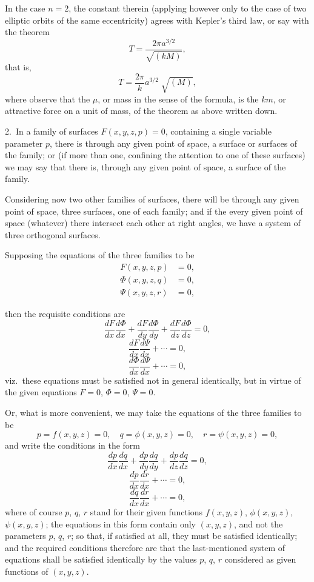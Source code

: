 \documentclass[11pt,a4paper]{book}
\begin{document}
In the case $n = 2$, the constant therein (applying however only to the case of two
elliptic orbits of the same eccentricity) agrees with Kepler's third law, or say with
the theorem
\[
T = \frac{2\pi a^{3/2}}{\sqrt{(kM)}},
\]
that is,
\[
T = \frac{2\pi}{k}a^{3/2}\;\sqrt{(M)},
\]
where observe that the $\mu$, or mass in the sense of the formula, is the $km$, or
attractive force on a unit of mass, of the theorem as above written down.

2.\ In a family of surfaces $F(x, y, z, p) = 0$, containing a single variable parameter $p$,
there is through any given point of space, a surface or surfaces of the family; or (if
more than one, confining the attention to one of these surfaces) we may say that
there is, through any given point of space, a surface of the family.

Considering now two other families of surfaces, there will be through any given
point of space, three surfaces, one of each family; and if the every given point of
space (whatever) there intersect each other at right angles, we have a system of three
orthogonal surfaces.

Supposing the equations of the three families to be
\begin{align*}
F(x, y, z, p) &= 0, \\
\Phi(x, y, z, q) &= 0, \\
\Psi(x, y, z, r) &= 0,
\end{align*}

\clearpage

\noindent
then the requisite conditions are
\[
\frac{dF}{dx}\frac{d\Phi}{dx} + \frac{dF}{dy}\frac{d\Phi}{dy} + \frac{dF}{dz}\frac{d\Phi}{dz} = 0,
\]
\[
\frac{dF}{dx}\frac{d\Psi}{dx} + \cdots = 0,
\]
\[
\frac{d\Phi}{dx}\frac{d\Psi}{dx} + \cdots = 0,
\]
viz.\ these equations must be satisfied not in general identically, but in virtue of the
given equations $F = 0$, $\Phi = 0$, $\Psi = 0$.

Or, what is more convenient, we may take the equations of the three families
to be
\[
p = f(x, y, z) = 0, \quad q = \phi(x, y, z) = 0, \quad r = \psi(x, y, z) = 0,
\]
and write the conditions in the form
\[
\frac{dp}{dx}\frac{dq}{dx} + \frac{dp}{dy}\frac{dq}{dy} + \frac{dp}{dz}\frac{dq}{dz} = 0,
\]
\[
\frac{dp}{dx}\frac{dr}{dx} + \cdots = 0,
\]
\[
\frac{dq}{dx}\frac{dr}{dx} + \cdots = 0,
\]
where of course $p$, $q$, $r$ stand for their given functions $f(x, y, z)$, $\phi(x, y, z)$, $\psi(x, y, z)$; the
equations in this form contain only $(x, y, z)$, and not the parameters $p$, $q$, $r$; so that,
if satisfied at all, they must be satisfied identically; and the required conditions therefore
are that the last-mentioned system of equations shall be satisfied identically by the
values $p$, $q$, $r$ considered as given functions of $(x, y, z)$.
\end{document}

